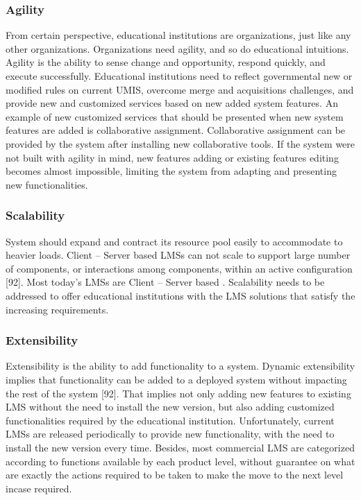 \documentclass[12pt,a4paper,final,twoside,onecolumn,titlepage]{book}
\begin{document}
\subsubsection{Agility}
From certain perspective, educational institutions are organizations, just like any other organizations. Organizations need agility, and so do educational intuitions. Agility is the ability to sense change and opportunity, respond quickly, and execute successfully. Educational institutions need to reflect governmental new or modified rules on current \gls{UMIS}, overcome merge and acquisitions challenges, and provide new and customized services based on new added system features. An example of new customized services that should be presented when new system features are added is collaborative assignment. Collaborative assignment can be provided by the system after installing new collaborative tools. If the system were not built with agility in mind, new features adding or existing features editing becomes almost impossible, limiting the system from adapting and presenting new functionalities.

\subsubsection{Scalability}
System should expand and contract its resource pool easily to accommodate to heavier loads. Client – Server based \gls{LMS}s can not scale to support large number of components, or interactions among components, within an active configuration [92]. Most today’s \gls{LMS}s are Client – Server based \cite{UMIS41}. Scalability needs to be addressed to offer educational institutions with the \gls{LMS} solutions that satisfy the increasing requirements.

\subsubsection{Extensibility}
Extensibility is the ability to add functionality to a system. Dynamic extensibility implies that functionality can be added to a deployed system without impacting the rest of the system [92]. That implies not only adding new features to existing \gls{LMS} without the need to install the new version, but also adding customized functionalities required by the educational institution. Unfortunately, current \gls{LMS}s are released periodically to provide new functionality, with the need to install the new version every time. Besides, most commercial \gls{LMS} are categorized according to functions available by each product level, without guarantee on what are exactly the actions required to be taken to make the move to the next level incase required.
\end{document}
